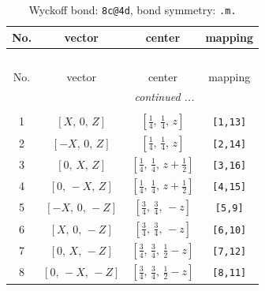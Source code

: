 \documentclass[fleqn,8pt]{jsarticle}
\begin{document}
\begin{longtable}{cccc}
\caption{Wyckoff bond: {\tt 8c@4d}, bond symmetry: {\tt .m.}}
 \\
 \hline \hline
No. & vector & center & mapping \\ \hline \endfirsthead

\multicolumn{3}{l}{\tablename\ \thetable{}} \\
 \hline \hline
No. & vector & center & mapping \\ \hline \endhead

 \hline \hline
\multicolumn{3}{r}{\footnotesize\it continued ...} \\ \endfoot

 \hline \hline
\multicolumn{3}{r}{} \\ \endlastfoot

1 & $\left[ X,\, 0,\, Z \right]$ & $\left[ \frac{1}{4},\, \frac{1}{4},\, z \right]$ & {\tt [1,13]} \\ \hline
2 & $\left[ - X,\, 0,\, Z \right]$ & $\left[ \frac{1}{4},\, \frac{1}{4},\, z \right]$ & {\tt [2,14]} \\ \hline
3 & $\left[ 0,\, X,\, Z \right]$ & $\left[ \frac{1}{4},\, \frac{1}{4},\, z + \frac{1}{2} \right]$ & {\tt [3,16]} \\ \hline
4 & $\left[ 0,\, - X,\, Z \right]$ & $\left[ \frac{1}{4},\, \frac{1}{4},\, z + \frac{1}{2} \right]$ & {\tt [4,15]} \\ \hline
5 & $\left[ - X,\, 0,\, - Z \right]$ & $\left[ \frac{3}{4},\, \frac{3}{4},\, - z \right]$ & {\tt [5,9]} \\ \hline
6 & $\left[ X,\, 0,\, - Z \right]$ & $\left[ \frac{3}{4},\, \frac{3}{4},\, - z \right]$ & {\tt [6,10]} \\ \hline
7 & $\left[ 0,\, X,\, - Z \right]$ & $\left[ \frac{3}{4},\, \frac{3}{4},\, \frac{1}{2} - z \right]$ & {\tt [7,12]} \\ \hline
8 & $\left[ 0,\, - X,\, - Z \right]$ & $\left[ \frac{3}{4},\, \frac{3}{4},\, \frac{1}{2} - z \right]$ & {\tt [8,11]} \\
\end{longtable}
\renewcommand{\arraystretch}{1.2}
\end{document}

